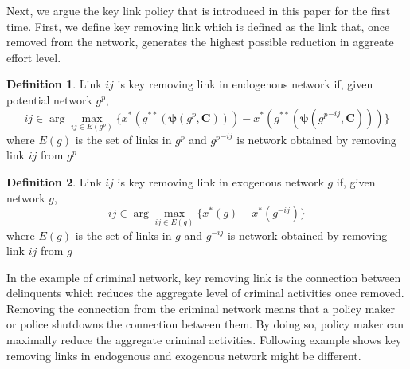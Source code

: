 \documentclass[12pt]{article}
\theoremstyle{definition}
\newtheorem{definition}{Definition}
\begin{document}
Next, we argue the key link policy that is introduced in this paper for the first time.
First, we define key removing link which is defined as the link that, once removed from the network, generates the highest possible reduction in aggreate effort level.

\begin{definition}
	Link $ij$ is key removing link in endogenous network if, given potential network $g^p$,
    \[ ij \in \arg \max_{ij \in E(g^p)} \{ x^*(g^{**}(\bm{\psi}(g^p, \bm{C}))) - x^*(g^{**}(\bm{\psi}({g^p}^{-ij}, \bm{C}))) \} \]
    where $E(g)$ is the set of links in $g^p$ and ${g^p}^{-ij}$ is network obtained by removing link $ij$ from $g^p$
\end{definition}

\begin{definition}
	Link $ij$ is key removing link in exogenous network $g$ if, given network $g$,
    \[ ij \in \arg \max_{ij \in E(g)} \{ x^*(g) - x^*(g^{-ij}) \} \]
    where $E(g)$ is the set of links in $g$ and $g^{-ij}$ is network obtained by removing link $ij$ from $g$
\end{definition}

In the example of criminal network, key removing link is the connection between delinquents which reduces the aggregate level of criminal activities once removed.
Removing the connection from the criminal network means that a policy maker or police shutdowns the connection between them.
By doing so, policy maker can maximally reduce the aggregate criminal activities.
Following example shows key removing links in endogenous and exogenous network might be different.
\end{document}
